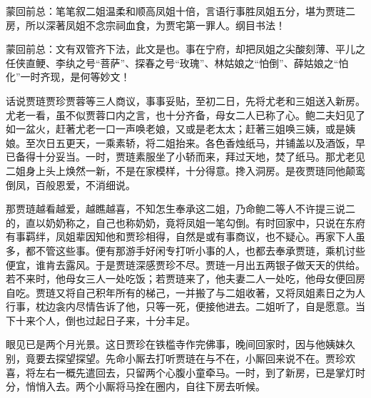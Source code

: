 

\begin{parag}
    \begin{note}蒙回前总：笔笔叙二姐温柔和顺高凤姐十倍，言语行事胜凤姐五分，堪为贾琏二房，所以深著凤姐不念宗祠血食，为贾宅第一罪人。纲目书法！\end{note}
\end{parag}


\begin{parag}
    \begin{note}蒙回前总：文有双管齐下法，此文是也。事在宁府，却把凤姐之尖酸刻薄、平儿之任侠直鲠、李纨之号“菩萨”、探春之号“玫瑰”、林姑娘之“怕倒”、薛姑娘之“怕化”一时齐现，是何等妙文！\end{note}
\end{parag}


\begin{parag}
    话说贾琏贾珍贾蓉等三人商议，事事妥贴，至初二日，先将尤老和三姐送入新房。尤老一看，虽不似贾蓉口内之言，也十分齐备，母女二人已称了心。鲍二夫妇见了如一盆火，赶著尤老一口一声唤老娘，又或是老太太；赶著三姐唤三姨，或是姨娘。至次日五更天，一乘素轿，将二姐抬来。各色香烛纸马，并铺盖以及酒饭，早已备得十分妥当。一时，贾琏素服坐了小轿而来，拜过天地，焚了纸马。那尤老见二姐身上头上焕然一新，不是在家模样，十分得意。搀入洞房。是夜贾琏同他颠鸾倒凤，百般恩爱，不消细说。
\end{parag}


\begin{parag}
    那贾琏越看越爱，越瞧越喜，不知怎生奉承这二姐，乃命鲍二等人不许提三说二的，直以奶奶称之，自己也称奶奶，竟将凤姐一笔勾倒。有时回家中，只说在东府有事羁绊，凤姐辈因知他和贾珍相得，自然是或有事商议，也不疑心。再家下人虽多，都不管这些事。便有那游手好闲专打听小事的人，也都去奉承贾琏，乘机讨些便宜，谁肯去露风。于是贾琏深感贾珍不尽。贾琏一月出五两银子做天天的供给。若不来时，他母女三人一处吃饭；若贾琏来了，他夫妻二人一处吃，他母女便回房自吃。贾琏又将自己积年所有的梯己，一并搬了与二姐收著，又将凤姐素日之为人行事，枕边衾内尽情告诉了他，只等一死，便接他进去。二姐听了，自是愿意。当下十来个人，倒也过起日子来，十分丰足。
\end{parag}


\begin{parag}
    眼见已是两个月光景。这日贾珍在铁槛寺作完佛事，晚间回家时，因与他姨妹久别，竟要去探望探望。先命小厮去打听贾琏在与不在，小厮回来说不在。贾珍欢喜，将左右一概先遣回去，只留两个心腹小童牵马。一时，到了新房，已是掌灯时分，悄悄入去。两个小厮将马拴在圈内，自往下房去听候。
\end{parag}



